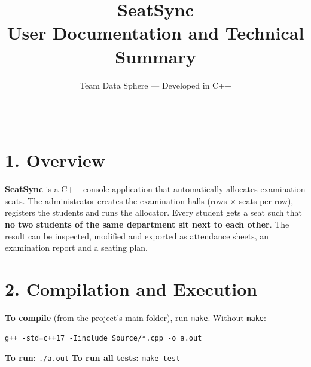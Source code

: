 \documentclass[a4paper,12pt]{article}
\title{\vspace{-2cm}\textbf{SeatSync}\\\large User Documentation and Technical Summary}
\author{Team Data Sphere --- Developed in C++}
\date{}
\begin{document}
\maketitle
\vspace{-0.4cm}
\hrule
\vspace{0.4cm}

\section*{1. Overview}
\textbf{SeatSync} is a C++ console application that automatically allocates examination seats. The administrator creates the examination halls (rows $\times$ seats per row), registers the students and runs the allocator. Every student gets a seat such that \textbf{no two students of the same department sit next to each other}. The result can be inspected, modified and exported as attendance sheets, an examination report and a seating plan.

\section*{2. Compilation and Execution}
\textbf{To compile} (from the project's main folder), run \texttt{make}. Without \texttt{make}:
\begin{verbatim}
g++ -std=c++17 -Iinclude Source/*.cpp -o a.out
\end{verbatim}
\textbf{To run:} \texttt{./a.out} \qquad \textbf{To run all tests:} \texttt{make test}
\end{document}
